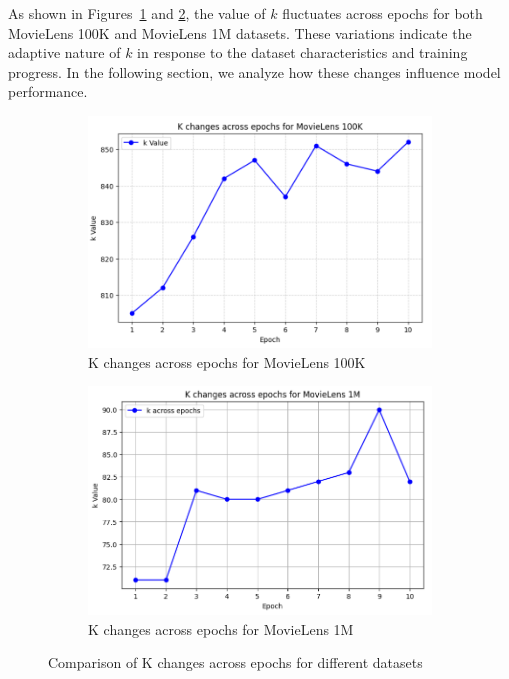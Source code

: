 \documentclass[Afour,sageh,times]{sagej}
\begin{document}
As shown in Figures~\ref{fig:k_changes_100K} and \ref{fig:k_changes_1M}, the value of $k$ fluctuates across epochs for both MovieLens 100K and MovieLens 1M datasets. These variations indicate the adaptive nature of $k$ in response to the dataset characteristics and training progress. In the following section, we analyze how these changes influence model performance.  

\begin{figure}[htbp]
	\centering
	\begin{subfigure}{0.48\linewidth}
		\centering
		\includegraphics[width=\linewidth]{CHAGES_OF_K_FOR_100k.png}
		\caption{K changes across epochs for MovieLens 100K}
		\label{fig:k_changes_100K}
	\end{subfigure}
	\hfill
	\begin{subfigure}{0.48\linewidth}
		\centering
		\includegraphics[width=\linewidth]{chnages_inK_for_1M.png}
		\caption{K changes across epochs for MovieLens 1M}
		\label{fig:k_changes_1M}
	\end{subfigure}
	\caption{Comparison of K changes across epochs for different datasets}
	\label{fig:k_changes}
\end{figure}
\end{document}
